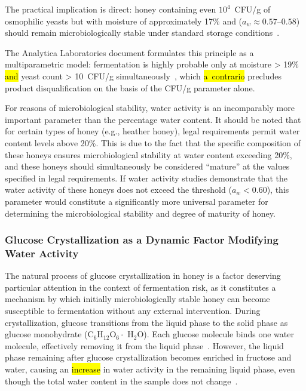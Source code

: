 \documentclass[foods,review,accept,pdftex,moreauthors]{Definitions/mdpi}
\begin{document}
{The practical implication is direct: 
honey containing even $10^4$~CFU/g of osmophilic yeasts but with moisture of approximately 17\% and ($a_w \approx 0.57$--$0.58$) should remain microbiologically stable under standard storage conditions~\cite{alwaili2012}.


The Analytica Laboratories document formulates this principle
as a multiparametric model: fermentation is highly probable only
at moisture > 19$\%$ \hl{and} yeast count > 10~CFU/g
simultaneously~\cite{analytica2020}, which \hl{a~contrario} %
precludes product disqualification on the basis of the CFU/g
parameter alone.

For reasons of microbiological stability, water activity is an
incomparably more important parameter than the percentage water
content. It should be noted that for certain types of honey
(e.g., heather honey), legal requirements permit water content
levels above 20\%. This is due to the fact that the specific
composition of these honeys ensures microbiological stability at
water content exceeding 20\%, and these honeys should simultaneously
be considered ``mature'' at the values specified in legal
requirements. If water activity studies demonstrate that the water
activity of these honeys does not exceed the threshold
($a_w < 0.60$), this parameter would constitute a significantly
more universal parameter for determining the microbiological
stability and degree of maturity of honey.

\subsubsection{Glucose Crystallization as a Dynamic Factor Modifying Water Activity}

The natural process of glucose crystallization in honey is a factor
deserving particular attention in the context of fermentation risk,
as it constitutes a mechanism by which initially microbiologically
stable honey can become susceptible to fermentation without any
external intervention. During crystallization, glucose transitions
from the liquid phase to the solid phase as glucose monohydrate
(C$_6$H$_{12}$O$_6 \cdot$ H$_2$O). Each glucose molecule binds
one water molecule, effectively removing it from the liquid
phase~\cite{zamora2006}. However, the liquid phase remaining
after glucose crystallization becomes enriched in fructose and
water, causing an \hl{increase} in water activity in the
remaining liquid phase, even though the total water content in
the sample does not change~\cite{zamora2006,ijfans2019}.

}
\end{document}
